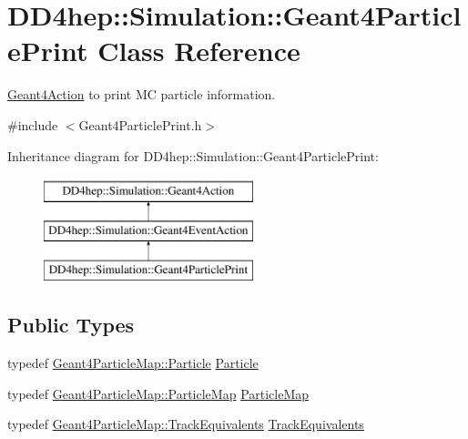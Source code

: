 \hypertarget{class_d_d4hep_1_1_simulation_1_1_geant4_particle_print}{}\section{D\+D4hep\+:\+:Simulation\+:\+:Geant4\+Particle\+Print Class Reference}
\label{class_d_d4hep_1_1_simulation_1_1_geant4_particle_print}


\hyperlink{class_d_d4hep_1_1_simulation_1_1_geant4_action}{Geant4\+Action} to print MC particle information.  




{\ttfamily \#include $<$Geant4\+Particle\+Print.\+h$>$}

Inheritance diagram for D\+D4hep\+:\+:Simulation\+:\+:Geant4\+Particle\+Print\+:\begin{figure}[H]
\begin{center}
\leavevmode
\includegraphics[height=3.000000cm]{class_d_d4hep_1_1_simulation_1_1_geant4_particle_print}
\end{center}
\end{figure}
\subsection*{Public Types}
\begin{DoxyCompactItemize}
\item 
typedef \hyperlink{class_d_d4hep_1_1_simulation_1_1_geant4_particle_map_a01ed68f2fc2e55ecf936e5ac3e6eae5f}{Geant4\+Particle\+Map\+::\+Particle} \hyperlink{class_d_d4hep_1_1_simulation_1_1_geant4_particle_print_a0d1712b05821d64c3f75e6226f553aa2}{Particle}
\item 
typedef \hyperlink{class_d_d4hep_1_1_simulation_1_1_geant4_particle_map_a065c5fb0629285022b9aa2a628bffef3}{Geant4\+Particle\+Map\+::\+Particle\+Map} \hyperlink{class_d_d4hep_1_1_simulation_1_1_geant4_particle_print_a1c6a9ccb9393484ee16c7cd344e20f4a}{Particle\+Map}
\item 
typedef \hyperlink{class_d_d4hep_1_1_simulation_1_1_geant4_particle_map_aba09f5fcb2dd5874d129660ad4454a21}{Geant4\+Particle\+Map\+::\+Track\+Equivalents} \hyperlink{class_d_d4hep_1_1_simulation_1_1_geant4_particle_print_af3d655fbfb9d0a270a3df703205c4b5b}{Track\+Equivalents}
\end{DoxyCompactItemize}
